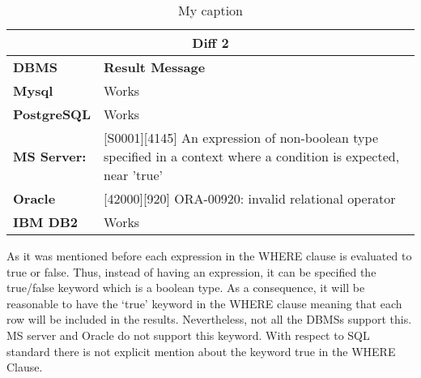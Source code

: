  
\begin{table}[h]
\centering
\caption{My caption}
\label{my-label}
\begin{tabular}{|p{2cm}|p{12cm}|}
\hline
\multicolumn{2}{|c|}{\textbf{Diff 2}}                                                                                                                                                         \\ \hline
\textbf{DBMS}                              & \textbf{Result Message}                                                                                                                          \\ \hline
{\color[HTML]{333333} \textbf{Mysql}}      & {\color[HTML]{333333} Works}                                                                                                                     \\ \hline
{\color[HTML]{333333} \textbf{PostgreSQL}} & {\color[HTML]{333333} Works}                                                                                                                     \\ \hline
{\color[HTML]{333333} \textbf{MS Server:}} & {\color[HTML]{333333} {[}S0001{]}{[}4145{]} An expression of non-boolean type specified in a context where a condition is expected, near 'true'} \\ \hline
\textbf{Oracle}                            & {[}42000{]}{[}920{]} ORA-00920: invalid relational operator                                                                                      \\ \hline
\textbf{IBM DB2}                           & Works                                                                                                                                            \\ \hline
\end{tabular}
\end{table}

As it was mentioned before each expression in the WHERE clause is evaluated to true or false. Thus, instead of having an expression, it can be specified the true/false keyword which is a boolean type. As a consequence, it will be reasonable to have the ‘true’ keyword in the WHERE clause meaning that each row will be included in the results. Nevertheless, not all the DBMSs support this. MS server and Oracle do not support this keyword. With respect to SQL standard there is not explicit mention about the keyword true in the WHERE Clause. 

